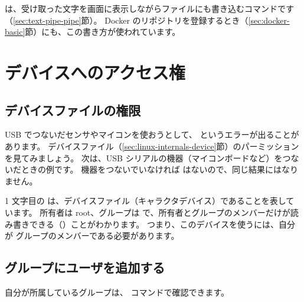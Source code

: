 
 は、受け取った文字を画面に表示しながらファイルにも書き込むコマンドです（\ref{sec:text-pipe-pipe}節）。
Docker のリポジトリを登録するとき（\ref{sec:docker-basic}節）にも、この書き方が使われています。

\section{デバイスへのアクセス権}
\label{sec:permission-device}

\subsection{デバイスファイルの権限}

USB でつないだセンサやマイコンを使おうとして、 というエラーが出ることがあります。
デバイスファイル（\ref{sec:linux-internals-device}節）のパーミッションを見てみましょう。
次は、USB シリアルの機器（マイコンボードなど）をつないだときの例です。
機器をつないでいなければ  はないので、同じ結果にはなりません。


1 文字目の  は、デバイスファイル（キャラクタデバイス）であることを表しています。
所有者は root、グループは  で、所有者とグループのメンバーだけが読み書きできる（）ことがわかります。
つまり、このデバイスを使うには、自分が  グループのメンバーである必要があります。

\subsection{グループにユーザを追加する}

自分が所属しているグループは、 コマンドで確認できます。


